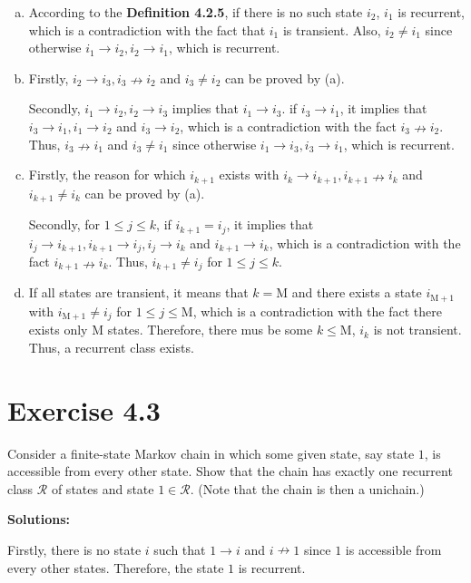 \documentclass{article}
\begin{document}
    \begin{enumerate}[(a)]
        \item According to the \textbf{Definition 4.2.5}, if there is no such state $i_2$, $i_1$ is recurrent, which is a contradiction with the fact that $i_1$ is transient. Also, $i_2\neq i_1$ since otherwise $i_1\rightarrow i_2,i_2\rightarrow i_1$, which is recurrent.
        \item Firstly, $i_2\rightarrow i_3,i_3\nrightarrow i_2$ and $i_3\neq i_2$ can be proved by (a). 
        
        Secondly, $i_1\rightarrow i_2, i_2\rightarrow i_3$ implies that $i_1\rightarrow i_3$. if $i_3\rightarrow i_1$,  it implies that $i_3\rightarrow i_1, i_1\rightarrow i_2$ and $i_3\rightarrow i_2$, which is a contradiction with the fact $i_3\nrightarrow i_2$. Thus, $i_3\nrightarrow i_1$ and $i_3\neq i_1$ since otherwise $i_1\rightarrow i_3,i_3\rightarrow i_1$, which is recurrent.
        \item Firstly, the reason for which $i_{k+1}$ exists with $i_k\rightarrow i_{k+1}, i_{k+1}\nrightarrow i_k$ and $i_{k+1}\neq i_k$ can be proved by (a). 
        
        Secondly, for $1\leq j\leq k$, if $i_{k+1}=i_j$, it implies that $i_j\rightarrow i_{k+1}, i_{k+1}\rightarrow i_j, i_j\rightarrow i_k$ and $i_{k+1}\rightarrow i_k$, which is a contradiction with the fact $i_{k+1}\nrightarrow i_k$. Thus, $i_{k+1}\neq i_j$ for $1\leq j\leq k$.
        \item If all states are transient, it means that $k=\text{M}$ and there exists a state $i_{\text{M}+1}$ with $i_{\text{M}+1}\neq i_j$ for $1\leq j\leq \text{M}$, which is a contradiction with the fact there exists only $\text{M}$ states. Therefore, there mus be some $k\leq\text{M}$, $i_k$ is not transient. Thus, a recurrent class exists.
    \end{enumerate}

    \section{Exercise 4.3}
    Consider a finite-state Markov chain in which some given state, say state $1$, is accessible from every other state. Show that the chain has exactly one recurrent class $\mathcal{R}$ of states and state $1\in\mathcal{R}$. (Note that the chain is then a unichain.)

    \textbf{Solutions:}
    
    Firstly, there is no state $i$ such that $1\rightarrow i$ and $i\nrightarrow 1$ since $1$ is accessible from every other states. Therefore, the state $1$ is recurrent.
    
\end{document}
